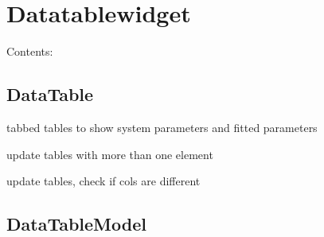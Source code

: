 \documentclass[letterpaper,10pt,english]{sphinxmanual}
\begin{document}
\chapter{Datatablewidget}
\label{Datatablewidget::doc}\label{Datatablewidget:datatablewidget}
Contents:


\section{DataTable}
\label{DataTable:datatable}\label{DataTable::doc}

\begin{fulllineitems}
\label{DataTable:Datatablewidget.DataTable}
tabbed tables to show system parameters and fitted parameters

\begin{fulllineitems}
\label{DataTable:Datatablewidget.DataTable.bulk_update_pandas_table}
update tables with more than one element

\end{fulllineitems}


\begin{fulllineitems}
\label{DataTable:Datatablewidget.DataTable.update_pandas_table}
update tables, check if cols are different

\end{fulllineitems}


\end{fulllineitems}



\section{DataTableModel}
\label{DataTableModel:datatablemodel}\label{DataTableModel::doc}
\end{document}
